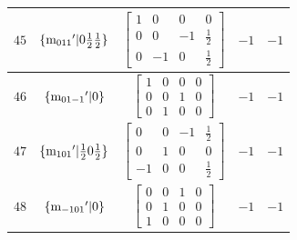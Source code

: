 \documentclass[fleqn,8pt]{jsarticle}
\begin{document}
\begin{longtable}{ccccc}
$ 45 $ & $ \{{\rm m}_{011}{}'|0 \frac{1}{2} \frac{1}{2}\} $ & $ \begin{bmatrix} 1 & 0 & 0 & 0 \\ 0 & 0 & -1 & \frac{1}{2} \\ 0 & -1 & 0 & \frac{1}{2} \end{bmatrix} $ & $ -1 $ & $ -1 $ \\ \hline
$ 46 $ & $ \{{\rm m}_{01-1}{}'|0\} $ & $ \begin{bmatrix} 1 & 0 & 0 & 0 \\ 0 & 0 & 1 & 0 \\ 0 & 1 & 0 & 0 \end{bmatrix} $ & $ -1 $ & $ -1 $ \\ \hline
$ 47 $ & $ \{{\rm m}_{101}{}'|\frac{1}{2} 0 \frac{1}{2}\} $ & $ \begin{bmatrix} 0 & 0 & -1 & \frac{1}{2} \\ 0 & 1 & 0 & 0 \\ -1 & 0 & 0 & \frac{1}{2} \end{bmatrix} $ & $ -1 $ & $ -1 $ \\ \hline
$ 48 $ & $ \{{\rm m}_{-101}{}'|0\} $ & $ \begin{bmatrix} 0 & 0 & 1 & 0 \\ 0 & 1 & 0 & 0 \\ 1 & 0 & 0 & 0 \end{bmatrix} $ & $ -1 $ & $ -1 $ \\
\end{longtable}
\end{document}
